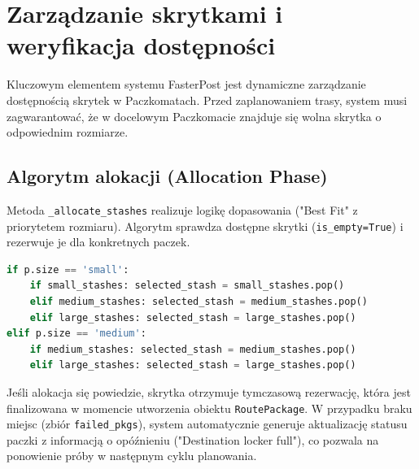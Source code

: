 \section{Zarządzanie skrytkami i weryfikacja dostępności}

Kluczowym elementem systemu FasterPost jest dynamiczne zarządzanie dostępnością skrytek w Paczkomatach. Przed zaplanowaniem trasy, system musi zagwarantować, że w docelowym Paczkomacie znajduje się wolna skrytka o odpowiednim rozmiarze.

\subsection{Algorytm alokacji (Allocation Phase)}

Metoda \texttt{\_allocate\_stashes} realizuje logikę dopasowania ("Best Fit" z priorytetem rozmiaru). Algorytm sprawdza dostępne skrytki (\texttt{is\_empty=True}) i rezerwuje je dla konkretnych paczek.

\begin{lstlisting}[language=Python, caption=Logika dopasowania rozmiaru paczki do skrytki]
if p.size == 'small':
    if small_stashes: selected_stash = small_stashes.pop()
    elif medium_stashes: selected_stash = medium_stashes.pop()
    elif large_stashes: selected_stash = large_stashes.pop()
elif p.size == 'medium':
    if medium_stashes: selected_stash = medium_stashes.pop()
    elif large_stashes: selected_stash = large_stashes.pop()
\end{lstlisting}

Jeśli alokacja się powiedzie, skrytka otrzymuje tymczasową rezerwację, która jest finalizowana w momencie utworzenia obiektu \texttt{RoutePackage}. W przypadku braku miejsc (zbiór \texttt{failed\_pkgs}), system automatycznie generuje aktualizację statusu paczki z informacją o opóźnieniu ("Destination locker full"), co pozwala na ponowienie próby w następnym cyklu planowania.
